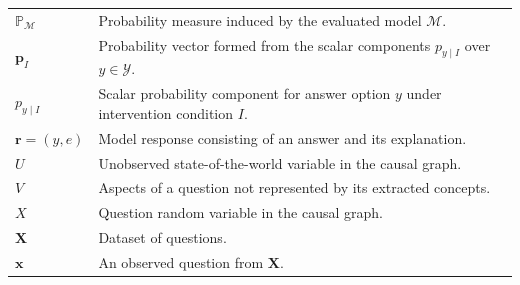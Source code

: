 \begin{longtable}{@{}>{\raggedright\arraybackslash}p{} p{}@{}}
	$\mathbb{P}_{\mathcal{M}}$                         & Probability measure induced by the evaluated model $\mathcal{M}$.                                                                                                                                     \\
	$\mathbf{p}_{I}$                                   & Probability vector formed from the scalar components $p_{y\mid I}$ over $y\in\mathcal{Y}$.                                                                                                            \\
	$p_{y\mid I}$                                      & Scalar probability component for answer option $y$ under intervention condition $I$.                                                                                                                  \\
	$\mathbf{r}=(y,e)$                                 & Model response consisting of an answer and its explanation.                                                                                                                                           \\
	$U$                                                & Unobserved state-of-the-world variable in the causal graph.                                                                                                                                           \\
	$V$                                                & Aspects of a question not represented by its extracted concepts.                                                                                                                                      \\
	$X$                                                & Question random variable in the causal graph.                                                                                                                                                         \\
	$\mathbf{X}$                                       & Dataset of questions.                                                                                                                                                                                 \\
	$\mathbf{x}$                                       & An observed question from $\mathbf{X}$.                                                                                                                                                               \\

\end{longtable}
